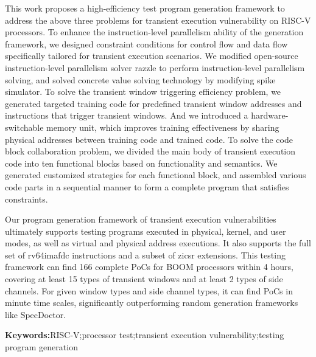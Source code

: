 This work proposes a high-efficiency test program generation framework
to address the above three problems for transient execution vulnerability on RISC-V processors.
To enhance the instruction-level parallelism ability of the generation framework, 
we designed constraint conditions for control flow and data flow specifically tailored for transient execution scenarios. 
We modified open-source instruction-level parallelism solver razzle to perform instruction-level parallelism solving, 
and solved concrete value solving technology by modifying spike simulator.
To solve the transient window triggering efficiency problem,
we generated targeted training code for predefined transient window addresses and instructions 
that trigger transient windows. 
And we introduced a hardware-switchable memory unit, 
which improves training effectiveness by sharing physical addresses between training code and trained code.
To solve the code block collaboration problem, 
we divided the main body of transient execution code into ten functional blocks based on functionality and semantics. 
We generated customized strategies for each functional block, 
and assembled various code parts in a sequential manner 
to form a complete program that satisfies constraints.\par

Our program generation framework of transient execution vulnerabilities 
ultimately supports testing programs executed in physical, kernel, and user modes, 
as well as virtual and physical address executions. 
It also supports the full set of rv64imafdc instructions and a subset of zicsr extensions. 
This testing framework can find 166 complete PoCs for BOOM processors within 4 hours, 
covering at least 15 types of transient windows and at least 2 types of side channels. 
For given window types and side channel types, it can find PoCs in minute time scales, 
significantly outperforming random generation frameworks like SpecDoctor.\par

\textbf{Keywords:}RISC-V;processor test;transient execution vulnerability;testing program generation


